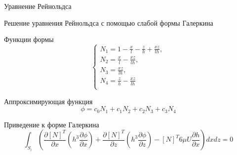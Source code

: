 \documentclass[ignoreonframetext,unicode]{beamer}
\begin{document}
\begin{frame}{Уравнение Рейнольдса}
	\end{frame}	

\begin{frame}{Решение уравнения Рейнольдса с помощью слабой формы Галеркина}
		



	\begin{block}{Функции формы}
		\[
			\begin{cases}
				N_1 = 1 - \frac{x}{l} - \frac{z}{h} + \frac{x  z}{l  h}, \\
				N_2 = \frac{x}{l} - \frac{x  z}{l  h}, \\
				N_3 = \frac{x  z}{l h}, \\
				N_4 = \frac{z}{h} - \frac{x  z}{l  h} \\
			\end{cases}
			\label{form-func}
		\]
	\end{block}


\begin{block}{Аппроксимирующая функция}
	\[
	\phi = c_0 N_1 + c_1 N_2 + c_2 N_3 + c_3 N_4
	\]
\end{block}

\begin{block}{Приведение к форме Галеркина}
	\begin{equation*}
		\int_{S_i} {\left( \frac{\partial[N]^T}{\partial x} \left(h^3 \frac{\partial \phi}{\partial x} \right) +  \frac{\partial[N]^T}{\partial z} \left(h^3 \frac{\partial \phi}{\partial z} \right) - [N]^T 6 \mu U \frac{\partial h}{\partial x}\right) dxdz} = 0
	\end{equation*}
\end{block}
	
\end{frame}
\end{document}
